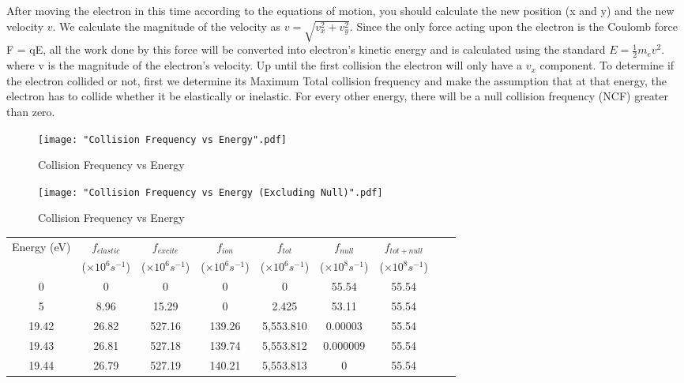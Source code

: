 \documentclass[12pt]{article}
\begin{document}
After moving the electron in this time according to the equations of motion, you should calculate the new position (x and y) and the new velocity $v$. We calculate the magnitude of the velocity as
$v = \sqrt{v_x ^2 + v_y ^2}$. Since the only force acting upon the electron is the Coulomb force F = qE, all the work done by this force will be converted into electron’s kinetic energy and is calculated 
using the standard $E = \frac{1}{2}m_e v^2$. where v is the magnitude of the electron’s velocity. Up until the first collision the electron will only have a $v_x$ component. To determine if the electron collided 
or not, first we determine its Maximum Total collision frequency and make the assumption that at that energy, the electron has to collide whether it be elastically or inelastic. For every other energy, there 
will be a null collision frequency (NCF) greater than zero. 

\begin{figure}[h]
	\centering
	\texttt{[image: "Collision Frequency vs Energy".pdf]}
	\caption{Collision Frequency vs Energy}
	\label{fig:left}
\end{figure}

\begin{figure}[h]
	\centering
	\texttt{[image: "Collision Frequency vs Energy (Excluding Null)".pdf]}
	\caption{Collision Frequency vs Energy}
	\label{fig:left}
\end{figure}





\begin{table}[h]
	\centering
	
	\begin{tabular}{c c c c c c c c c}
		
		Energy (eV) &	$f_{elastic}$ &  $f_{excite}$& $f_{ion}$ & 	$f_{tot}$ &  $f_{null}$ & $f_{tot + null}$ \\
		
		&	($\times10^6 s^{-1}$) &  	($\times10^6 s^{-1}$) & 	($\times10^6 s^{-1}$) & 	($\times10^6 s^{-1}$)	&  ($\times10^8 s^{-1}$)&($\times10^8 s^{-1}$) \\
		
		\hline
		
		0 &	0 & 0 & 0 &0 & 55.54 &55.54\\
		
		5 & 8.96 & 15.29& 0	&2.425 & 53.11 & 55.54	\\
		
		19.42&26.82 & 527.16& 139.26& 5,553.810&0.00003 &55.54\\
		
		19.43& 26.81& 527.18& 139.74& 5,553.812& 0.000009&55.54\\
		
		19.44& 26.79& 527.19& 140.21& 5,553.813&0 &55.54\\
		
	\end{tabular}
	\label{cfs}
\end{table}
\end{document}
